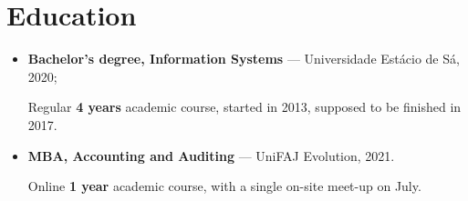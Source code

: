 \section{Education}

\begin{itemize}
  \item \textbf{Bachelor's degree, Information Systems} --- Universidade Estácio de Sá, 2020;

    Regular \textbf{4 years} academic course, started in 2013, supposed to be finished in 2017.

  \item \textbf{MBA, Accounting and Auditing} --- UniFAJ Evolution, 2021.

    Online \textbf{1 year} academic course, with a single on-site meet-up on July.

\end{itemize}
